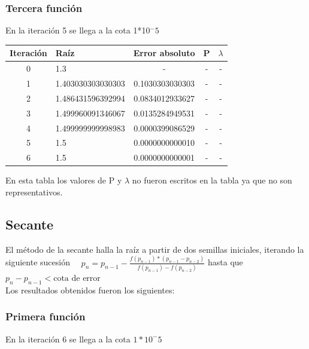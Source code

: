 \documentclass[titlepage,a4paper]{article}
\begin{document}
\subsubsection{Tercera función}\label{sec:NRM3}
En la iteración 5 se llega a la cota 1*10$^-5$
\begin{center}
\begin{tabular}{| c | l | c | c | c |}
    \hline
        Iteración & Raíz & Error absoluto & P & $\lambda$ \\ \hline
0      & 1.3  &  -  &  -  &  - \\
1      & 1.403030303030303  &  0.1030303030303  &  -  &  - \\   %
2      & 1.486431596392994  &  0.0834012933627  &  -  &  - \\
3      & 1.499960091346067  &  0.0135284949531  &  -  &  - \\
4      & 1.499999999998983  &  0.0000399086529  &  -  &  - \\
5      & 1.5  &  0.0000000000010 & - & - \\
6      & 1.5  &  0.0000000000001 & - & - \\
    \hline
    \end{tabular}
\end{center}
En esta tabla los valores de P y $\lambda$ no fueron escritos en la tabla ya que no son representativos.\\

\subsection{Secante}\label{sec:secante}
El método de la secante halla la raíz a partir de dos semillas iniciales, iterando la siguiente sucesión
$\quad p_{n} =p_{n-1}-\frac{f (p_{n-1})*(p_{n-1}-p_{n-2})}{f(p_{n-1})-f(p_{n-2})}$ hasta que $p_{n}-p_{n-1} < \mbox{cota de error}$
\\

Los resultados obtenidos fueron los siguientes:
\subsubsection{Primera función}\label{sec:sec1}

En la iteración 6 se llega a la cota $1*10^-5$
\end{document}
